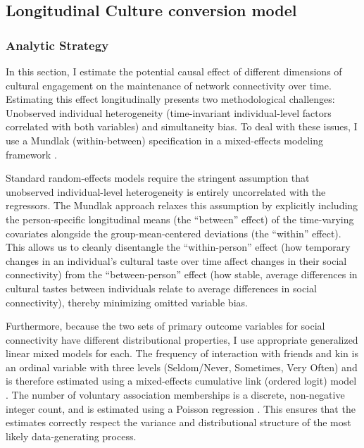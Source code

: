 \documentclass[
]{article}
\begin{document}
\subsection{Longitudinal Culture conversion model}\label{longitudinal-culture-conversion-model}

\subsubsection{Analytic Strategy}\label{analytic-strategy-1}

In this section, I estimate the potential causal effect of different dimensions of cultural engagement on the maintenance of network connectivity over time. Estimating this effect longitudinally presents two methodological challenges: Unobserved individual heterogeneity (time-invariant individual-level factors correlated with both variables) and simultaneity bias. To deal with these issues, I use a Mundlak (within-between) specification in a mixed-effects modeling framework \citep{mundlak1978pooling-5f5}. 

Standard random-effects models require the stringent assumption that unobserved individual-level heterogeneity is entirely uncorrelated with the regressors. The Mundlak approach relaxes this assumption by explicitly including the person-specific longitudinal means (the ``between'' effect) of the time-varying covariates alongside the group-mean-centered deviations (the ``within'' effect). This allows us to cleanly disentangle the ``within-person'' effect (how temporary changes in an individual's cultural taste over time affect changes in their social connectivity) from the ``between-person'' effect (how stable, average differences in cultural tastes between individuals relate to average differences in social connectivity), thereby minimizing omitted variable bias. 

Furthermore, because the two sets of primary outcome variables for social connectivity have different distributional properties, I use appropriate generalized linear mixed models for each. The frequency of interaction with friends and kin is an ordinal variable with three levels (Seldom/Never, Sometimes, Very Often) and is therefore estimated using a mixed-effects cumulative link (ordered logit) model \citep{winship1984regression-edb}. The number of voluntary association memberships is a discrete, non-negative integer count, and is estimated using a Poisson regression \citep{gardner1995regression-3ad}. This ensures that the estimates correctly respect the variance and distributional structure of the most likely data-generating process.
\end{document}
